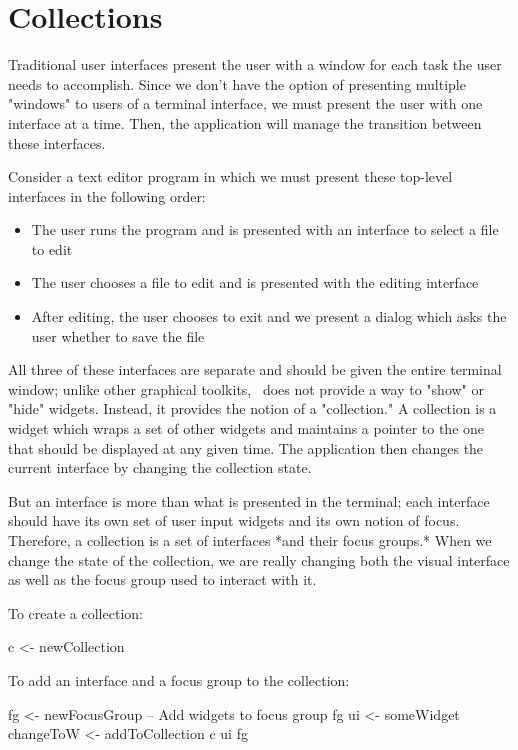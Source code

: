\section{Collections}

Traditional user interfaces present the user with a window for each task
the user needs to accomplish.  Since we don't have the option of
presenting multiple "windows" to users of a terminal interface, we must
present the user with one interface at a time.  Then, the application
will manage the transition between these interfaces.

Consider a text editor program in which we must present these top-level
interfaces in the following order:

\begin{itemize}
\item The user runs the program and is presented with an interface to
      select a file to edit
\item The user chooses a file to edit and is presented with the
      editing interface
\item After editing, the user chooses to exit and we present a dialog
      which asks the user whether to save the file
\end{itemize}

All three of these interfaces are separate and should be given the
entire terminal window; unlike other graphical toolkits, \vtyui\ does
not provide a way to "show" or "hide" widgets.  Instead, it provides
the notion of a "collection."  A collection is a widget which wraps a
set of other widgets and maintains a pointer to the one that should be
displayed at any given time.  The application then changes the current
interface by changing the collection state.

But an interface is more than what is presented in the terminal; each
interface should have its own set of user input widgets and its own
notion of focus.  Therefore, a collection is a set of interfaces *and
their focus groups.*  When we change the state of the collection, we are
really changing both the visual interface as well as the focus group
used to interact with it.

To create a collection:

\begin{haskellcode}
 c <- newCollection
\end{haskellcode}

To add an interface and a focus group to the collection:

\begin{haskellcode}
 fg <- newFocusGroup
 -- Add widgets to focus group fg
 ui <- someWidget
 changeToW <- addToCollection c ui fg
\end{haskellcode}


